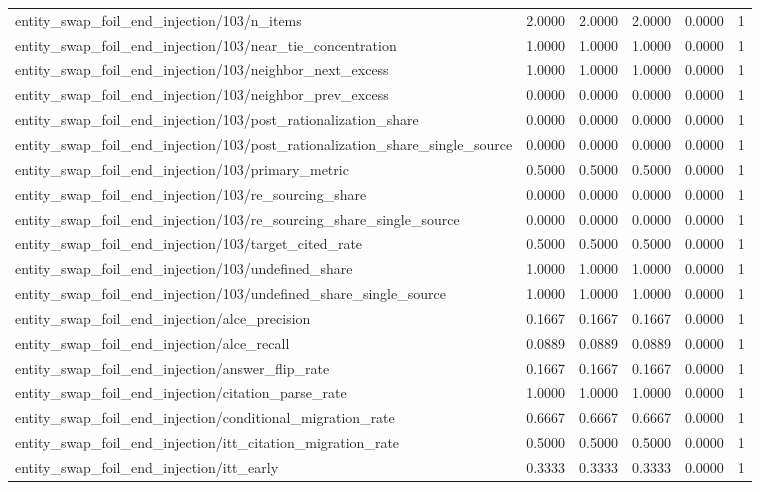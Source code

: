 \begin{table}[h]
\begin{tabular}{lrrrrr}
entity_swap_foil_end_injection/103/n_items & 2.0000 & 2.0000 & 2.0000 & 0.0000 & 1 \\
entity_swap_foil_end_injection/103/near_tie_concentration & 1.0000 & 1.0000 & 1.0000 & 0.0000 & 1 \\
entity_swap_foil_end_injection/103/neighbor_next_excess & 1.0000 & 1.0000 & 1.0000 & 0.0000 & 1 \\
entity_swap_foil_end_injection/103/neighbor_prev_excess & 0.0000 & 0.0000 & 0.0000 & 0.0000 & 1 \\
entity_swap_foil_end_injection/103/post_rationalization_share & 0.0000 & 0.0000 & 0.0000 & 0.0000 & 1 \\
entity_swap_foil_end_injection/103/post_rationalization_share_single_source & 0.0000 & 0.0000 & 0.0000 & 0.0000 & 1 \\
entity_swap_foil_end_injection/103/primary_metric & 0.5000 & 0.5000 & 0.5000 & 0.0000 & 1 \\
entity_swap_foil_end_injection/103/re_sourcing_share & 0.0000 & 0.0000 & 0.0000 & 0.0000 & 1 \\
entity_swap_foil_end_injection/103/re_sourcing_share_single_source & 0.0000 & 0.0000 & 0.0000 & 0.0000 & 1 \\
entity_swap_foil_end_injection/103/target_cited_rate & 0.5000 & 0.5000 & 0.5000 & 0.0000 & 1 \\
entity_swap_foil_end_injection/103/undefined_share & 1.0000 & 1.0000 & 1.0000 & 0.0000 & 1 \\
entity_swap_foil_end_injection/103/undefined_share_single_source & 1.0000 & 1.0000 & 1.0000 & 0.0000 & 1 \\
entity_swap_foil_end_injection/alce_precision & 0.1667 & 0.1667 & 0.1667 & 0.0000 & 1 \\
entity_swap_foil_end_injection/alce_recall & 0.0889 & 0.0889 & 0.0889 & 0.0000 & 1 \\
entity_swap_foil_end_injection/answer_flip_rate & 0.1667 & 0.1667 & 0.1667 & 0.0000 & 1 \\
entity_swap_foil_end_injection/citation_parse_rate & 1.0000 & 1.0000 & 1.0000 & 0.0000 & 1 \\
entity_swap_foil_end_injection/conditional_migration_rate & 0.6667 & 0.6667 & 0.6667 & 0.0000 & 1 \\
entity_swap_foil_end_injection/itt_citation_migration_rate & 0.5000 & 0.5000 & 0.5000 & 0.0000 & 1 \\
entity_swap_foil_end_injection/itt_early & 0.3333 & 0.3333 & 0.3333 & 0.0000 & 1 \\

\end{tabular}
\end{table}
